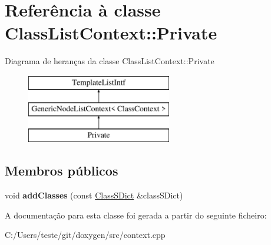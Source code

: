 \hypertarget{class_class_list_context_1_1_private}{\section{Referência à classe Class\-List\-Context\-:\-:Private}
\label{class_class_list_context_1_1_private}
}
Diagrama de heranças da classe Class\-List\-Context\-:\-:Private\begin{figure}[H]
\begin{center}
\leavevmode
\includegraphics[height=3.000000cm]{class_class_list_context_1_1_private}
\end{center}
\end{figure}
\subsection*{Membros públicos}
\begin{DoxyCompactItemize}
\item 
\hypertarget{class_class_list_context_1_1_private_af0975d15100c44d69ce3bda159f371bd}{void {\bfseries add\-Classes} (const \hyperlink{class_class_s_dict}{Class\-S\-Dict} \&class\-S\-Dict)}\label{class_class_list_context_1_1_private_af0975d15100c44d69ce3bda159f371bd}

\end{DoxyCompactItemize}


A documentação para esta classe foi gerada a partir do seguinte ficheiro\-:\begin{DoxyCompactItemize}
\item 
C\-:/\-Users/teste/git/doxygen/src/context.\-cpp\end{DoxyCompactItemize}
